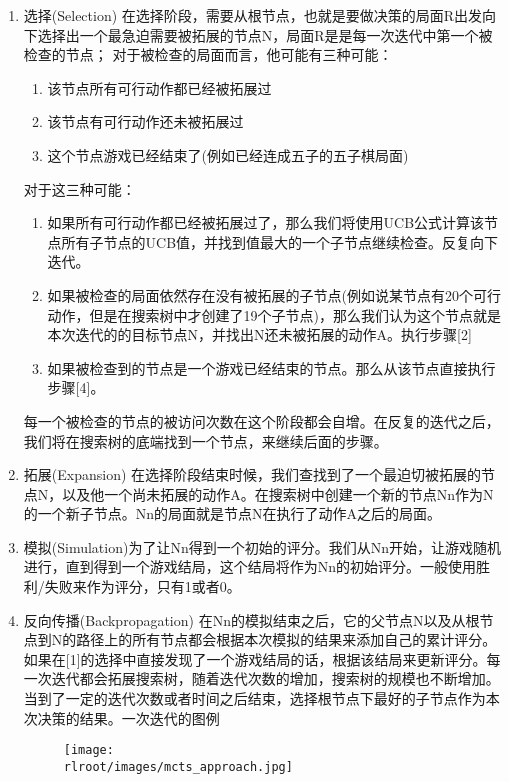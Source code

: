 \begin{enumerate}
\item 选择(Selection)
在选择阶段，需要从根节点，也就是要做决策的局面R出发向下选择出一个最急迫需要被拓展的节点N，局面R是是每一次迭代中第一个被检查的节点；
对于被检查的局面而言，他可能有三种可能：
    \begin{enumerate}
    \item 该节点所有可行动作都已经被拓展过
    \item 该节点有可行动作还未被拓展过
    \item 这个节点游戏已经结束了(例如已经连成五子的五子棋局面)
    \end{enumerate}

对于这三种可能：
    \begin{enumerate}
    \item 如果所有可行动作都已经被拓展过了，那么我们将使用UCB公式计算该节点所有子节点的UCB值，并找到值最大的一个子节点继续检查。反复向下迭代。
    \item 如果被检查的局面依然存在没有被拓展的子节点(例如说某节点有20个可行动作，但是在搜索树中才创建了19个子节点)，那么我们认为这个节点就是本次迭代的的目标节点N，并找出N还未被拓展的动作A。执行步骤[2]
    \item 如果被检查到的节点是一个游戏已经结束的节点。那么从该节点直接执行步骤[4]。
    \end{enumerate}
每一个被检查的节点的被访问次数在这个阶段都会自增。在反复的迭代之后，我们将在搜索树的底端找到一个节点，来继续后面的步骤。

\item 拓展(Expansion)
在选择阶段结束时候，我们查找到了一个最迫切被拓展的节点N，以及他一个尚未拓展的动作A。在搜索树中创建一个新的节点Nn作为N的一个新子节点。Nn的局面就是节点N在执行了动作A之后的局面。

\item 模拟(Simulation)为了让Nn得到一个初始的评分。我们从Nn开始，让游戏随机进行，直到得到一个游戏结局，这个结局将作为Nn的初始评分。一般使用胜利/失败来作为评分，只有1或者0。

\item 反向传播(Backpropagation)
在Nn的模拟结束之后，它的父节点N以及从根节点到N的路径上的所有节点都会根据本次模拟的结果来添加自己的累计评分。如果在[1]的选择中直接发现了一个游戏结局的话，根据该结局来更新评分。每一次迭代都会拓展搜索树，随着迭代次数的增加，搜索树的规模也不断增加。当到了一定的迭代次数或者时间之后结束，选择根节点下最好的子节点作为本次决策的结果。一次迭代的图例
\begin{figure}[ht]
    \centering
    \texttt{[image: \\rlroot/images/mcts\_approach.jpg]}
    \label{fig:mcts_approach}
\end{figure}

\end{enumerate}

